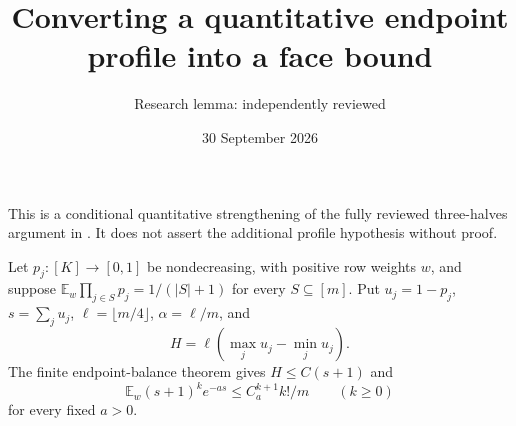 \documentclass[11pt]{article}
\title{Converting a quantitative endpoint profile into a face bound}
\author{Research lemma: independently reviewed}
\date{30 September 2026}
\newcommand{\E}{\mathbb E}
\begin{document}
\maketitle
This is a conditional quantitative strengthening of the fully reviewed
three-halves argument in .
It does not assert the additional profile hypothesis without proof.

Let $p_j:[K]\to[0,1]$ be nondecreasing, with positive row weights $w$,
and suppose $\E_w\prod_{j\in S}p_j=1/(|S|+1)$ for every $S\subseteq[m]$.
Put $u_j=1-p_j$, $s=\sum_j u_j$, $\ell=\lfloor m/4\rfloor$,
$\alpha=\ell/m$, and
\[
 H=\ell(\max_j u_j-\min_j u_j).
\]
The finite endpoint-balance theorem gives $H\le C(s+1)$ and
\begin{equation}\label{laplace}
 \E_w(s+1)^k e^{-as}\le C_a^{k+1}k!/m
 \qquad(k\ge0)
\end{equation}
for every fixed $a>0$.
\end{document}
